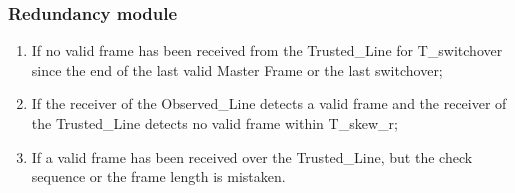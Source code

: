 \documentclass[12pt,beamer]{beamer}
\begin{document}
\begin{frame}
	\frametitle{Redundancy module}
		\begin{enumerate}
			\setlength{\itemsep}{20pt}
			\item If no valid frame has been received from the Trusted\_Line for T\_switchover since the end of the last valid Master Frame or the last switchover;
			\item If the receiver of the Observed\_Line detects a valid frame and the receiver of the Trusted\_Line detects no valid frame within T\_skew\_r;
			\item If a valid frame has been received over the Trusted\_Line, but the check sequence or the frame length is mistaken.
		\end{enumerate}
\end{frame}







%
%
%
%
%
%
%
\end{document}
